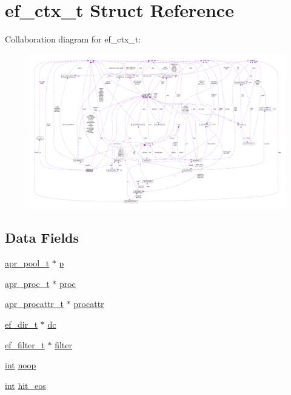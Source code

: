 \hypertarget{structef__ctx__t}{}\section{ef\+\_\+ctx\+\_\+t Struct Reference}
\label{structef__ctx__t}


Collaboration diagram for ef\+\_\+ctx\+\_\+t\+:
\nopagebreak
\begin{figure}[H]
\begin{center}
\leavevmode
\includegraphics[width=350pt]{structef__ctx__t__coll__graph}
\end{center}
\end{figure}
\subsection*{Data Fields}
\begin{DoxyCompactItemize}
\item 
\hyperlink{structapr__pool__t}{apr\+\_\+pool\+\_\+t} $\ast$ \hyperlink{structef__ctx__t_ab5432012dd82b0c976a3156bc0948c7c}{p}
\item 
\hyperlink{structapr__proc__t}{apr\+\_\+proc\+\_\+t} $\ast$ \hyperlink{structef__ctx__t_a83e4c77001d97a46b11660774be7a720}{proc}
\item 
\hyperlink{structapr__procattr__t}{apr\+\_\+procattr\+\_\+t} $\ast$ \hyperlink{structef__ctx__t_a580e2590db576ae34318ab60518b3a7d}{procattr}
\item 
\hyperlink{structef__dir__t}{ef\+\_\+dir\+\_\+t} $\ast$ \hyperlink{structef__ctx__t_a3bdb70457c7b6856c769f888eac6d80b}{dc}
\item 
\hyperlink{structef__filter__t}{ef\+\_\+filter\+\_\+t} $\ast$ \hyperlink{structef__ctx__t_a17c4c0df2aff4ca667acdf27c5ea0175}{filter}
\item 
\hyperlink{pcre_8txt_a42dfa4ff673c82d8efe7144098fbc198}{int} \hyperlink{structef__ctx__t_ac0b21c1c02f1a928d774e198d083db6a}{noop}
\item 
\hyperlink{pcre_8txt_a42dfa4ff673c82d8efe7144098fbc198}{int} \hyperlink{structef__ctx__t_a08e318992475b8f2397f0c4f28a9bf8e}{hit\+\_\+eos}
\end{DoxyCompactItemize}



